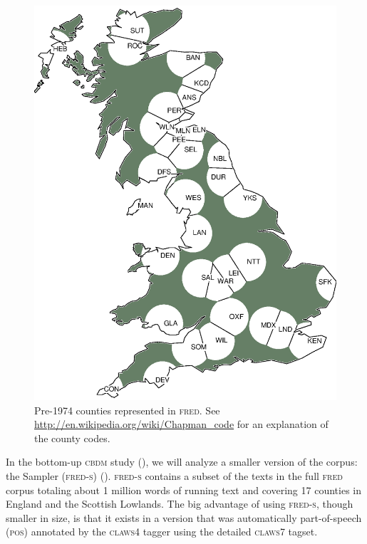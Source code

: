 \documentclass[output=paper]{LSP/langsci}
\begin{document}
\begin{figure}
    \includegraphics [keepaspectratio,width=.8\textwidth] {illustrations/wolk_map_descr_all34_counties.eps}
    \caption{Pre-1974 counties represented in \textsc{fred}. See \url{http://en.wikipedia.org/wiki/Chapman_code} for an explanation of the county codes.}\label{coverage}
\end{figure}


In the bottom-up \textsc{cbdm} study (), we will analyze a smaller version of the corpus: the  Sampler (\textsc{fred-s}) (\citealt{szmrecsanyi_manual_2007}). \textsc{fred-s} contains a subset of the texts in the full \textsc{fred} corpus totaling about 1 million words of running text and covering 17 counties in England and the Scottish Lowlands. The big advantage of using \textsc{fred-s}, though smaller in size, is that it exists in a version that was automatically part-of-speech (\textsc{pos}) annotated by the \textsc{claws4} tagger \citep{garside_hybrid_1997} using the detailed \textsc{claws7} tagset.
\end{document}
